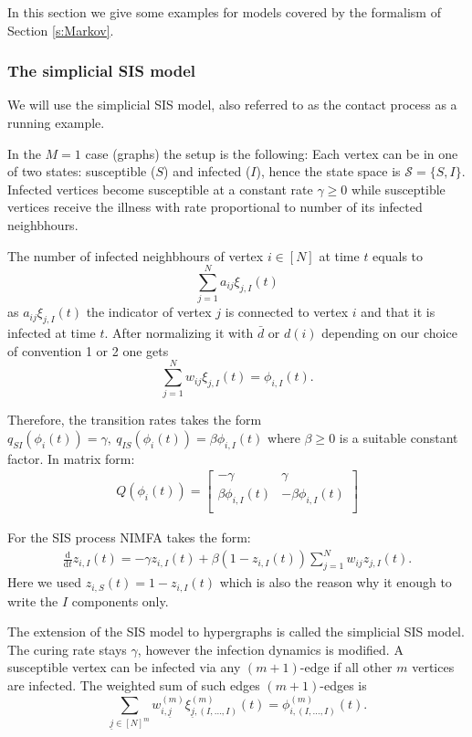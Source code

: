 \documentclass{article}
\newcommand{\ul}{\underline}
\renewcommand{\d}{\mathrm{d}}
\newcommand{\1}[1]{{\mathds{1}}_{\left\{#1\right\}}}
\renewcommand{\S}{\mathcal{S}}
\begin{document}
	In this section we give some examples for models covered by the formalism of Section \ref{s:Markov}.
	
	\subsubsection*{The simplicial SIS model}
	
	We will use the simplicial SIS model, also referred to as the contact process as a running example.
	
	In the $M=1$ case (graphs) the setup is the following: Each vertex can be in one of two states: susceptible ($S$) and infected ($I$), hence the state space is $\S=\{S,I \}.$ Infected vertices become susceptible at a constant rate $\gamma \geq 0$ while susceptible vertices receive the illness with rate proportional to number of its infected neighbhours.
	
	The number of infected neighbhours of vertex $i \in [N]$ at time $t$ equals to
	$$ \sum_{j=1}^N a_{ij}\xi_{j,I}(t) $$
	as $a_{ij}\xi_{j,I}(t)$ the indicator of vertex $j$ is connected to vertex $i$ and that it is infected at time $t$. After normalizing it with $\bar{d}$ or $d(i)$ depending on our choice of convention 1 or 2 one gets
	$$\sum_{j=1}^N w_{ij} \xi_{j,I}(t)=\phi_{i,I}(t). $$
	
	Therefore, the transition rates takes the form $q_{SI}(\phi_i(t))=\gamma, \ q_{IS}(\phi_i(t))=\beta \phi_{i,I}(t)$ where $\beta \geq 0$ is a suitable constant factor. In matrix form:
	\begin{align*}
		Q(\phi_i(t))=
		\left[ {\begin{array}{cc}
				-\gamma & \gamma \\
				\beta \phi_{i,I}(t) & -\beta \phi_{i,I}(t) \\
		\end{array} } \right]
	\end{align*}
	
	For the SIS process NIMFA takes the form:
	\begin{align*}
		\frac{\d}{\d t} z_{i,I}(t)=-\gamma z_{i,I}(t)+\beta(1-z_{i,I}(t))\sum_{j=1}^{N}w_{ij}z_{j,I}(t).
	\end{align*}
	Here we used $z_{i,S}(t)=1-z_{i,I}(t)$ which is also the reason why it enough to write the $I$ components only.
	
	The extension of the SIS model to hypergraphs is called the simplicial SIS model. The curing rate stays $\gamma$, however the infection dynamics is modified. A susceptible vertex can be infected via any $(m+1)$-edge if all other $m$ vertices are infected. The weighted sum of such edges $(m+1)$-edges is
	$$ \sum_{\ul{j} \in [N]^{m}} w_{i,\ul{j}}^{(m)} \xi_{\ul{j},(I,\dots, I)}^{(m)}(t)=\phi_{i,(I,\dots,I)}^{(m)}(t). $$
	
\end{document}
